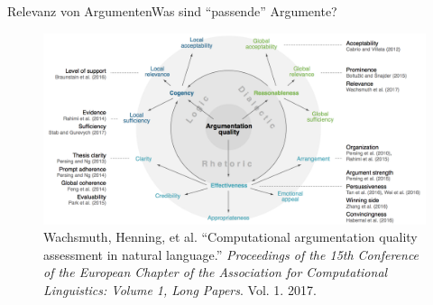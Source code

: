 \documentclass{beamer}
\begin{document}
	\begin{frame}{Relevanz von Argumenten}{Was sind ``passende'' Argumente?}
		\begin{figure}
			\includegraphics[width=\textwidth]{img/discussion-taxonomy}
			\caption{\small Wachsmuth, Henning, et al. ``Computational argumentation quality assessment in natural language.'' \textit{Proceedings of the 15th Conference of the European Chapter of the Association for Computational Linguistics: Volume 1, Long Papers}. Vol. 1. 2017.}
		\end{figure}
	\end{frame}
\end{document}
